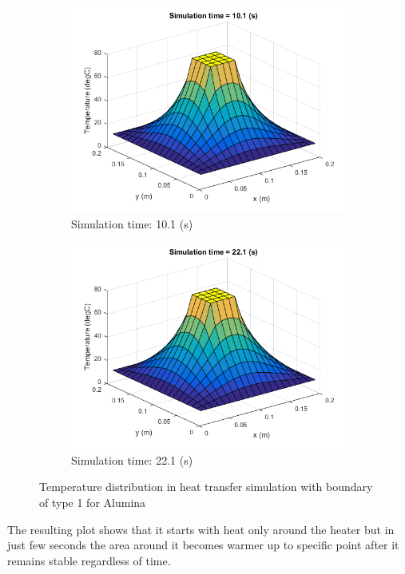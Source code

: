 \documentclass[12pt]{article}
\begin{document}
\begin{figure}[H]
\begin{subfigure}[b]{0.475\textwidth}
		\includegraphics[width=\textwidth]{b_1b}
		{{\small Simulation time: 10.1 (s)}}    
	\end{subfigure}
	\quad
	\begin{subfigure}[b]{0.475\textwidth}   
		\centering 
		\includegraphics[width=\textwidth]{b_1c}
		{{\small Simulation time: 22.1 (s)}}    
	\end{subfigure}
	{\small Temperature distribution in heat transfer simulation with boundary of type 1 for Alumina} 
\end{figure}

The resulting plot shows that it starts with heat only around the heater but in just few seconds the area around it becomes warmer up to specific point after it remains stable regardless of time.
\end{document}
